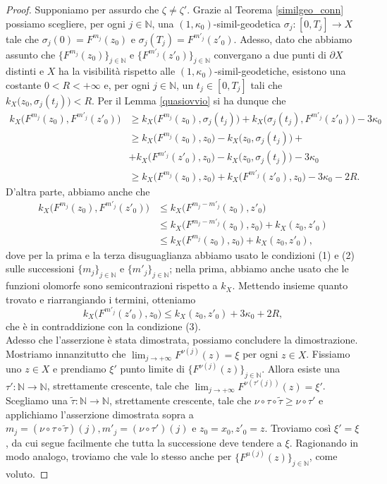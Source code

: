 \begin{proof}
    Supponiamo per assurdo che $\zeta\not=\zeta'$. Grazie al Teorema \ref{similgeo_conn} possiamo scegliere, per ogni $j\in\mathbb{N}$, una $(1,\kappa_0)$-simil-geodetica $\sigma_j:[0,T_j] \longrightarrow X$ tale che $\sigma_j(0)=F^{m_j}(z_0)$ e $\sigma_j(T_j)=F^{m'_j}(z'_0)$. Adesso, dato che abbiamo assunto che $\{F^{m_j}(z_0)\}_{j\in\mathbb{N}}$ e $\{F^{m'_j}(z'_0)\}_{j\in\mathbb{N}}$ convergano a due punti di $\partial X$ distinti e $X$ ha la visibilità rispetto alle $(1,\kappa_0)$-simil-geodetiche, esistono una costante $0<R<+\infty$ e, per ogni $j\in\mathbb{N}$, un $t_j\in[0,T_j]$ tali che $k_X\big(z_0,\sigma_j(t_j)\big)<R$. Per il Lemma \ref{quasiovvio} si ha dunque che
    \begin{align*}
        k_X\big(F^{m_j}(z_0),F^{m'_j}(z'_0)\big) &\ge k_X\big(F^{m_j}(z_0),\sigma_j(t_j)\big)+k_X\big(\sigma_j(t_j),F^{m'_j}(z'_0)\big)-3\kappa_0\\
        &\ge k_X\big(F^{m_j}(z_0),z_0\big)-k_X\big(z_0,\sigma_j(t_j)\big)+\\
        &+k_X\big(F^{m'_j}(z'_0),z_0\big)-k_X\big(z_0,\sigma_j(t_j)\big)-3\kappa_0\\
        &\ge k_X\big(F^{m_j}(z_0),z_0\big)+k_X\big(F^{m'_j}(z'_0),z_0\big)-3\kappa_0-2R.
    \end{align*}
    D'altra parte, abbiamo anche che
    \begin{align*}
        k_X\big(F^{m_j}(z_0),F^{m'_j}(z'_0)\big) &\le k_X\big(F^{m_j-m'_j}(z_0),z'_0\big) \\
        &\le k_X\big(F^{m_j-m'_j}(z_0),z_0\big)+k_X(z_0,z'_0) \\
        &\le k_X\big(F^{m_j}(z_0),z_0\big)+k_X(z_0,z'_0),
    \end{align*}
    dove per la prima e la terza disuguaglianza abbiamo usato le condizioni (1) e (2) sulle successioni $\{m_j\}_{j\in\mathbb{N}}$ e $\{m'_j\}_{j\in\mathbb{N}}$; nella prima, abbiamo anche usato che le funzioni olomorfe sono semicontrazioni rispetto a $k_X$. Mettendo insieme quanto trovato e riarrangiando i termini, otteniamo
    $$k_X\big(F^{m'_j}(z'_0),z_0\big) \le k_X(z_0,z'_0)+3\kappa_0+2R,$$
    che è in contraddizione con la condizione (3).\\

    Adesso che l'asserzione è stata dimostrata, possiamo concludere la dimostrazione. Mostriamo innanzitutto che $\displaystyle\lim_{j\longrightarrow+\infty}F^{\nu(j)}(z)=\xi$ per ogni $z\in X$. Fissiamo uno $z\in X$ e prendiamo $\xi'$ punto limite di $\{F^{\nu(j)}(z)\}_{j\in\mathbb{N}}$. Allora esiste una $\tau':\mathbb{N}\longrightarrow\mathbb{N}$, strettamente crescente, tale che $\displaystyle \lim_{j\longrightarrow+\infty} F^{\nu\left(\tau'(j)\right)}(z)=\xi'$. Scegliamo una $\tilde{\tau}:\mathbb{N}\longrightarrow\mathbb{N}$, strettamente crescente, tale che $\nu\circ\tau\circ\tilde{\tau} \ge \nu\circ\tau'$ e applichiamo l'asserzione dimostrata sopra a $m_j=(\nu\circ\tau\circ\tilde{\tau})(j), m'_j=(\nu\circ\tau')(j)$ e $z_0=x_0,z'_0=z$. Troviamo così $\xi'=\xi$, da cui segue facilmente che tutta la successione deve tendere a $\xi$. Ragionando in modo analogo, troviamo che vale lo stesso anche per $\{F^{\mu(j)}(z)\}_{j\in\mathbb{N}}$, come voluto.
\end{proof}

